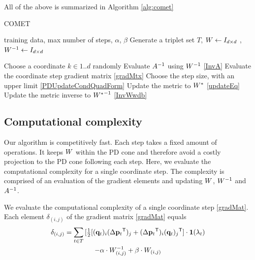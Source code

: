 \documentclass{article}
\begin{document}

All of the above is summarized in Algorithm \ref{alg:comet}

\begin{algorithm}[tb]
   \caption{COMET}
   \label{alg:comet}
\begin{algorithmic}[1]
    training data, max number of steps, $\alpha$, $\beta$
   \STATE Generate a triplet set $T$, ${W}  \leftarrow I_{d \times d}$ , ${W}^{-1}  \leftarrow I_{d \times d}$

   \REPEAT 
   \STATE Choose a coordinate $k \in {1..d}$ randomly
   \STATE Evaluate ${A}^{-1}$ using ${W}^{-1}$ \eqref{InvA}
   \STATE Evaluate the coordinate step gradient matrix \eqref{gradMtx}
   \STATE Choose the step size, with an upper limit  \eqref{PDUpdateCondQuadForm}
   \STATE Update the metric to ${{W^*}}$ \eqref{updateEq}
   \STATE Update the metric inverse to ${{W^*}}^{-1}$ \eqref{InvWwdb}
\end{algorithmic}
\end{algorithm}

\subsection{Computational complexity}
Our algorithm is competitively fast. Each step takes a fixed amount of operations. It keeps ${W}$ within the PD cone and therefore avoid a costly projection to the PD cone following each step. Here, we evaluate the computational complexity for a single coordinate step. The complexity is comprised of an evaluation of the gradient elements and updating ${W}$, ${W}^{-1}$ and ${A}^{-1}$.

We evaluate the computational complexity of a single coordinate step \eqref{gradMat}. Each element $\delta_{(i,j)}$ of the gradient matrix \eqref{gradMat} equals
\begin{multline}
\delta_{(i,j)} = \sum\limits_{t\in T}{ [\tfrac{1}{2}[(\mathbf{q}_{t})_i(\Delta\mathbf{p}_{t}{}^\mathsf{T})_j + (\Delta\mathbf{p}_{t}{}^\mathsf{T})_i(\mathbf{q}_{t})_j{}^\mathsf{T}] } \cdot \textbf{1}(\lambda_t)  \\ 
 - \alpha \cdot {W}^{-1}_{(i,j)} + \beta \cdot {W}_{(i,j)}
\label{gradMatElem}
\end{multline}
\end{document}
